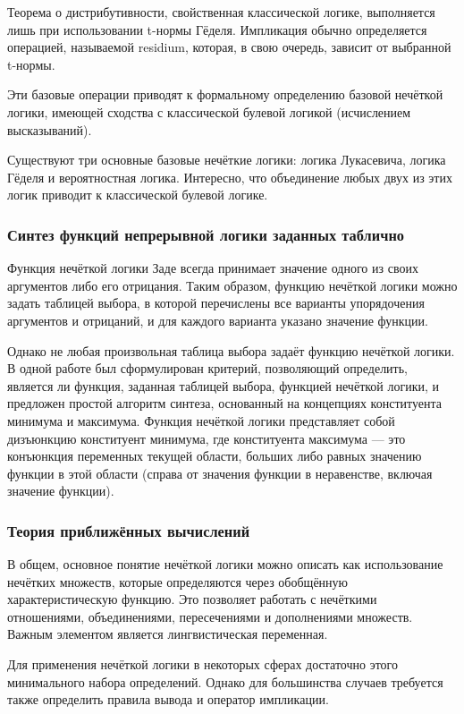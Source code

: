 Теорема о дистрибутивности, свойственная классической логике, выполняется лишь при использовании t-нормы Гёделя. Импликация обычно определяется операцией, называемой residium, которая, в свою очередь, зависит от выбранной t-нормы.

Эти базовые операции приводят к формальному определению базовой нечёткой логики, имеющей сходства с классической булевой логикой (исчислением высказываний).

Существуют три основные базовые нечёткие логики: логика Лукасевича, логика Гёделя и вероятностная логика. Интересно, что объединение любых двух из этих логик приводит к классической булевой логике.

\subsubsection{Синтез функций непрерывной логики заданных таблично}
Функция нечёткой логики Заде всегда принимает значение одного из своих аргументов либо его отрицания. Таким образом, функцию нечёткой логики можно задать таблицей выбора, в которой перечислены все варианты упорядочения аргументов и отрицаний, и для каждого варианта указано значение функции.

Однако не любая произвольная таблица выбора задаёт функцию нечёткой логики. В одной работе был сформулирован критерий, позволяющий определить, является ли функция, заданная таблицей выбора, функцией нечёткой логики, и предложен простой алгоритм синтеза, основанный на концепциях конституента минимума и максимума. Функция нечёткой логики представляет собой дизъюнкцию конституент минимума, где конституента максимума — это конъюнкция переменных текущей области, больших либо равных значению функции в этой области (справа от значения функции в неравенстве, включая значение функции).

\subsubsection{Теория приближённых вычислений}
В общем, основное понятие нечёткой логики можно описать как использование нечётких множеств, которые определяются через обобщённую характеристическую функцию. Это позволяет работать с нечёткими отношениями, объединениями, пересечениями и дополнениями множеств. Важным элементом является лингвистическая переменная.

Для применения нечёткой логики в некоторых сферах достаточно этого минимального набора определений. Однако для большинства случаев требуется также определить правила вывода и оператор импликации.

